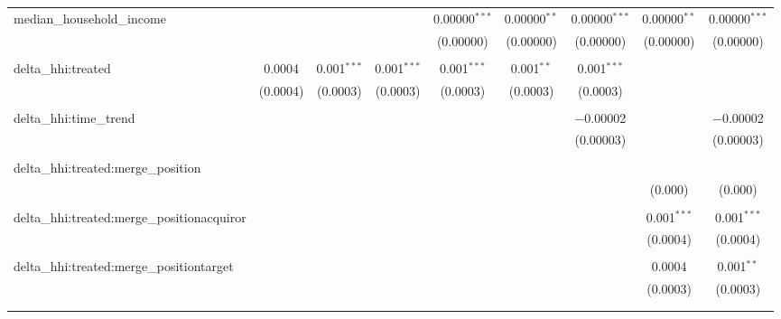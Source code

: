 \begin{table}[H]
{\begin{tabular}{@{\extracolsep{5pt}}lcccccccc}
  median\_household\_income &  &  &  & 0.00000$^{***}$ & 0.00000$^{**}$ & 0.00000$^{***}$ & 0.00000$^{**}$ & 0.00000$^{***}$ \\  

   &  &  &  & (0.00000) & (0.00000) & (0.00000) & (0.00000) & (0.00000) \\  

   & & & & & & & & \\  

  delta\_hhi:treated & 0.0004 & 0.001$^{***}$ & 0.001$^{***}$ & 0.001$^{***}$ & 0.001$^{**}$ & 0.001$^{***}$ &  &  \\  

   & (0.0004) & (0.0003) & (0.0003) & (0.0003) & (0.0003) & (0.0003) &  &  \\  

   & & & & & & & & \\  

  delta\_hhi:time\_trend &  &  &  &  &  & $-$0.00002 &  & $-$0.00002 \\  

   &  &  &  &  &  & (0.00003) &  & (0.00003) \\  

   & & & & & & & & \\  

  delta\_hhi:treated:merge\_position &  &  &  &  &  &  &  &  \\  

   &  &  &  &  &  &  & (0.000) & (0.000) \\  

   & & & & & & & & \\  

  delta\_hhi:treated:merge\_positionacquiror &  &  &  &  &  &  & 0.001$^{***}$ & 0.001$^{***}$ \\  

   &  &  &  &  &  &  & (0.0004) & (0.0004) \\  

   & & & & & & & & \\  

  delta\_hhi:treated:merge\_positiontarget &  &  &  &  &  &  & 0.0004 & 0.001$^{**}$ \\  

   &  &  &  &  &  &  & (0.0003) & (0.0003) \\  

   & & & & & & & & \\  

 \hline \\[-1.8ex]  


\end{tabular}}
\end{table}
